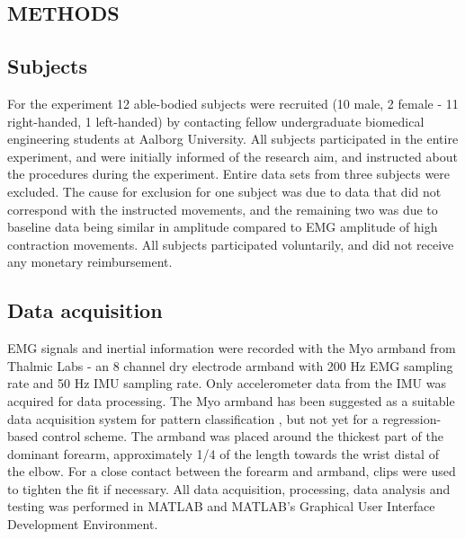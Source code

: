 \begin{multicols}{2}
\section*{METHODS}%
	
%		
\subsection*{Subjects}
For the experiment 12 able-bodied subjects were recruited (10 male, 2 female - 11 right-handed, 1 left-handed) by contacting fellow undergraduate biomedical engineering students at Aalborg University. All subjects participated in the entire experiment, and were initially informed of the research aim, and instructed about the procedures during the experiment. Entire data sets from three subjects were excluded. The cause for exclusion for one subject was due to data that did not correspond with the instructed movements, and the remaining two was due to baseline data being similar in amplitude compared to EMG amplitude of high contraction movements. All subjects participated voluntarily, and did not receive any monetary reimbursement. 

\subsection*{Data acquisition}
EMG signals and inertial information were recorded with the Myo armband from Thalmic Labs - an 8 channel dry electrode armband with 200 Hz EMG sampling rate and 50 Hz IMU sampling rate. Only accelerometer data from the IMU was acquired for data processing. The Myo armband has been suggested as a suitable data acquisition system for pattern classification \cite{Mendez2017}, but not yet for a regression-based control scheme. 
The armband was placed around the thickest part of the dominant forearm, approximately 1/4 of the length towards the wrist distal of the elbow. For a close contact between the forearm and armband, clips were used to tighten the fit if necessary. All data acquisition, processing, data analysis and testing was performed in MATLAB and MATLAB's Graphical User Interface Development Environment.


\end{multicols}
